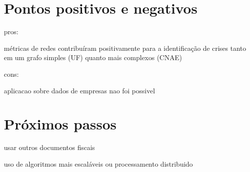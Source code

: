 
\section{Pontos positivos e negativos}

pros:

métricas de redes contribuíram positivamente para a identificação de crises tanto em um grafo simples (UF) quanto mais complexos (CNAE)

cons:

aplicacao sobre dados de empresas nao foi possivel

\section{Próximos passos}

usar outros documentos fiscais

uso de algoritmos mais escaláveis ou processamento distribuido

